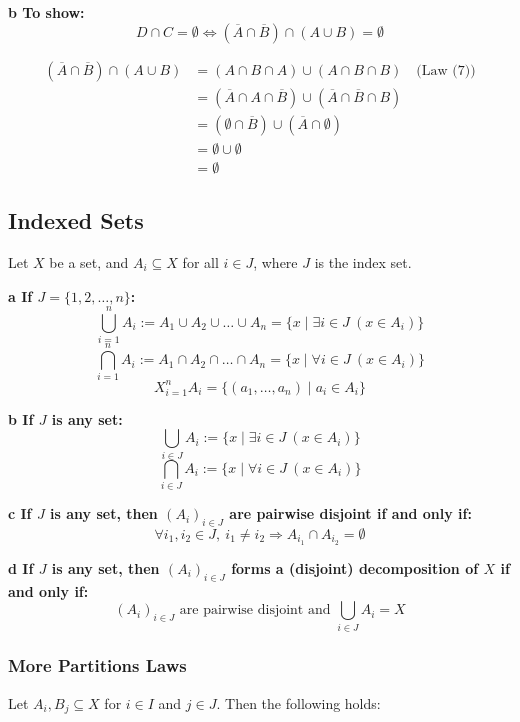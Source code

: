 \textbf{b To show:}
\[
	D \cap C = \emptyset \iff (\overline{A} \cap \overline{B}) \cap (A \cup B) = \emptyset
\]

\begin{align*}
	(\overline{A} \cap \overline{B}) \cap (A \cup B)
	 & = (A \cap B \cap A) \cup (A \cap B \cap B) \quad \text{(Law (7))}                      \\
	 & = (\overline{A} \cap A \cap \overline{B}) \cup (\overline{A} \cap \overline{B} \cap B) \\
	 & = (\emptyset \cap \overline{B}) \cup (\overline{A} \cap \emptyset)                     \\
	 & = \emptyset \cup \emptyset                                                             \\
	 & = \emptyset
\end{align*}

\subsection{Indexed Sets}
Let \( X \) be a set, and \( A_i \subseteq X \) for all \( i \in J \), where \( J \) is the index set.

\textbf{a If \( J = \{1, 2, \dots, n\} \):}
\[
	\bigcup_{i=1}^{n} A_i := A_1 \cup A_2 \cup \dots \cup A_n = \{ x \mid \exists i \in J \ (x \in A_i) \}
\]
\[
	\bigcap_{i=1}^{n} A_i := A_1 \cap A_2 \cap \dots \cap A_n = \{ x \mid \forall i \in J \ (x \in A_i) \}
\]
\[
	X_{i=1}^{n} A_i = \{(a_1, \dots, a_n) \mid a_i \in A_i \}
\]

\textbf{b If \( J \) is any set:}
\[
	\bigcup_{i \in J} A_i := \{ x \mid \exists i \in J \ (x \in A_i) \}
\]
\[
	\bigcap_{i \in J} A_i := \{ x \mid \forall i \in J \ (x \in A_i) \}
\]

\textbf{c If \( J \) is any set, then \( (A_i)_{i \in J} \) are pairwise disjoint if and only if:}
\[
	\forall i_1, i_2 \in J, \ i_1 \neq i_2 \Rightarrow A_{i_1} \cap A_{i_2} = \emptyset
\]

\textbf{d If \( J \) is any set, then \( (A_i)_{i \in J} \) forms a (disjoint) decomposition of \( X \) if and only if:}
\[
	(A_{i})_{i \in J} \text{ are pairwise disjoint and } \bigcup_{i \in J} A_i = X
\]

\subsubsection{More Partitions Laws}
Let \( A_i, B_j \subseteq X \) for \( i \in I \) and \( j \in J \). Then the following holds:

